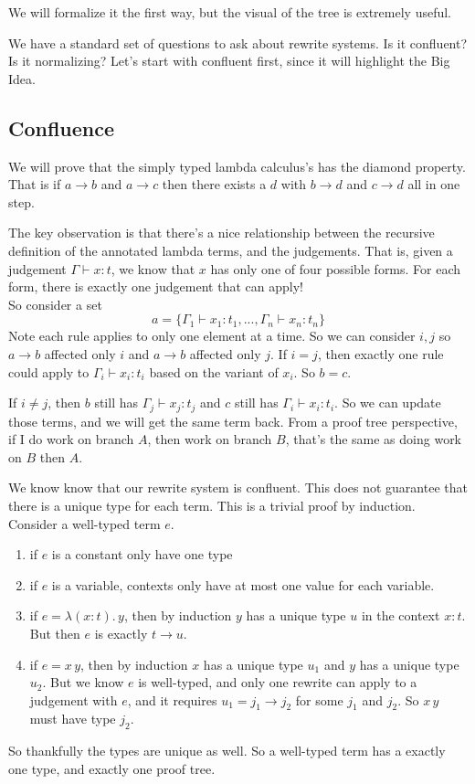 \documentclass[12pt]{article}
\begin{document}
We will formalize it the first way, but the visual of the tree is extremely useful.

We have a standard set of questions to ask about rewrite systems.
Is it confluent? Is it normalizing?
Let's start with confluent first, since it will highlight the Big Idea.

\subsection{Confluence}
We will prove that the simply typed lambda calculus's has the diamond property. 
That is if $a \rightarrow b$ and $a \rightarrow c$ then there exists a $d$ with $b \rightarrow d$ and $c \rightarrow d$ all in one step.

The key observation is that there's a nice relationship between the recursive definition of the annotated lambda terms, and the judgements.
That is, given a judgement $\Gamma \vdash x:t$, we know that $x$ has only one of four possible forms. For each form, there is exactly one judgement that can apply!
\\ \newline
So consider a set 
\[
  a = \{\Gamma_1\vdash x_1 : t_1,..., \Gamma_n\vdash x_n : t_n \}
\]
Note each rule applies to only one element at a time.
So we can consider $i,j$ so $a \rightarrow b$ affected only $i$ and $a \rightarrow b$ affected only $j$.
If $i = j$, then exactly one rule could apply to $\Gamma_i \vdash x_i:t_i$ based on the variant of $x_i$. So $b = c$.

If $i \neq j$, then $b$ still has $\Gamma_j \vdash x_j:t_j$ and $c$ still has $\Gamma_i \vdash x_i:t_i$.
So we can update those terms, and we will get the same term back.
From a proof tree perspective, if I do work on branch $A$, then work on branch $B$, that's the same as doing work on $B$ then $A$.
\\ \newline

We know know that our rewrite system is confluent.
This does not guarantee that there is a unique type for each term.
This is a trivial proof by induction.
Consider a well-typed term $e$.
\begin{enumerate}
    \item if $e$ is a constant only have one type
    \item if $e$ is a variable, contexts only have at most one value for each variable.
    \item if $e = \lambda (x:t).\,y$, then by induction $y$ has a unique type $u$ in the context $x:t$. But then $e$ is exactly $t \rightarrow u$.
    \item if $e = x\,y$, then by induction $x$ has a unique type $u_1$ and $y$ has a unique type $u_2$.
    But we know $e$ is well-typed, and only one rewrite can apply to a judgement with $e$, and it requires $u_1 = j_1 \rightarrow j_2$ for some $j_1$ and $j_2$. So $x\,y$ must have type $j_2$. 
\end{enumerate}
So thankfully the types are unique as well.
So a well-typed term has a exactly one type, and exactly one proof tree.
\end{document}

